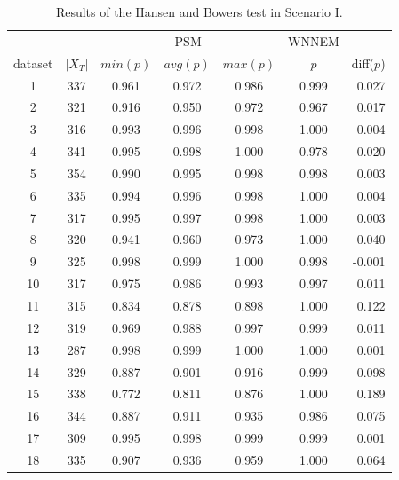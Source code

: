 		\begin{table}[h]
			\caption{Results of the Hansen and Bowers test in Scenario I.}
			\label{tab:wnnem_scen_I_stat_separated}
			\centering
			\begin{tabular}{ccccccr} 
				\toprule
				& & \multicolumn{3}{c}{PSM}
				& WNNEM & \\
				dataset & $|X_T|$ & $min (p)$ & $avg (p)$ & $max (p)$ & $p$   & diff($p$) \\
				\midrule
				1       & 337     & 0.961     & 0.972     & 0.986     & 0.999 & 0.027      \\
				2       & 321     & 0.916     & 0.950     & 0.972     & 0.967 & 0.017      \\
				3       & 316     & 0.993     & 0.996     & 0.998     & 1.000 & 0.004      \\
				4       & 341     & 0.995     & 0.998     & 1.000     & 0.978 & -0.020     \\
				5       & 354     & 0.990     & 0.995     & 0.998     & 0.998 & 0.003      \\
				6       & 335     & 0.994     & 0.996     & 0.998     & 1.000 & 0.004      \\
				7       & 317     & 0.995     & 0.997     & 0.998     & 1.000 & 0.003      \\
				8       & 320     & 0.941     & 0.960     & 0.973     & 1.000 & 0.040      \\
				9       & 325     & 0.998     & 0.999     & 1.000     & 0.998 & -0.001     \\
				10      & 317     & 0.975     & 0.986     & 0.993     & 0.997 & 0.011      \\
				11      & 315     & 0.834     & 0.878     & 0.898     & 1.000 & 0.122      \\
				12      & 319     & 0.969     & 0.988     & 0.997     & 0.999 & 0.011      \\
				13      & 287     & 0.998     & 0.999     & 1.000     & 1.000 & 0.001      \\
				14      & 329     & 0.887     & 0.901     & 0.916     & 0.999 & 0.098      \\
				15      & 338     & 0.772     & 0.811     & 0.876     & 1.000 & 0.189      \\
				16      & 344     & 0.887     & 0.911     & 0.935     & 0.986 & 0.075      \\
				17      & 309     & 0.995     & 0.998     & 0.999     & 0.999 & 0.001      \\
				18      & 335     & 0.907     & 0.936     & 0.959     & 1.000 & 0.064      \\

\end{tabular}
\end{table}
